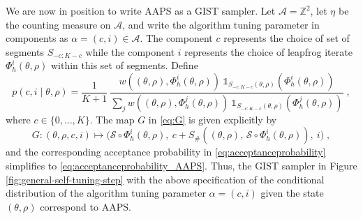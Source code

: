 \documentclass[letterpaper,11pt]{article}
\theoremstyle{plain}%
\theoremstyle{remark}
\begin{document}
We are now in position to write AAPS as a GIST sampler. Let $\mathcal{A} = \mathbb{Z}^2$, let $\eta$ be the counting measure on $\mathcal{A}$, and write the algorithm tuning parameter in components as $\alpha = (c, i) \in \mathcal{A}$. The component $c$ represents the choice of set of segments $S_{-c:K-c}$ while the component $i$ represents the choice of leapfrog iterate $\Phi_h^i(\theta, \rho)$ within this set of segments.  Define 
\[
p(c,i \mid \theta, \rho) 
= \frac{1}{K+1} 
\ \frac{w((\theta, \rho), \Phi_h^i(\theta, \rho)) 
        \ \mathds{1}_{S_{-c:K-c}(\theta, \rho)}(\Phi_h^i(\theta, \rho))}
        {\sum_j w((\theta, \rho), \Phi_h^j(\theta, \rho)) 
         \ \mathds{1}_{S_{-c:K-c}(\theta, \rho)}(\Phi_h^j(\theta, \rho))} \;,
\] 
where $c \in \{0, \dots, K \}$.  The map $G$ in \eqref{eq:G} is given explicitly by 
\[
G : (\theta, \rho, c, i) 
\mapsto  
\Big(\mathcal{S} \circ \Phi_h^i(\theta, \rho),
\ c + S_{\#}((\theta, \rho), \, \mathcal{S} \circ \Phi_h^i(\theta, \rho)), 
\ i \Big) \;,
\] 
and the corresponding acceptance probability in \eqref{eq:acceptanceprobability} simplifies to \eqref{eq:acceptanceprobability_AAPS}.  Thus, the GIST sampler in Figure \ref{fig:general-self-tuning-step} with the above specification of the conditional distribution of the algorithm tuning parameter $\alpha = (c,i)$ given the state $(\theta, \rho)$ correspond to AAPS. %

\end{document}
